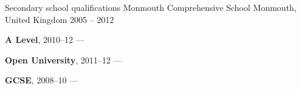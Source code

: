 \begin{cventries}
    \cventry
        {Secondary school qualifications}
        {Monmouth Comprehensive School}
        {Monmouth, United Kingdom}
        {2005 -- 2012}
        {
        \begin{cvitems}
            \item {\textbf{A Level}, 2010--12 --- }
            \item {\textbf{Open University}, 2011--12 --- }
            \item {\textbf{GCSE}, 2008--10 --- }
        \end{cvitems}
        }
\end{cventries}
